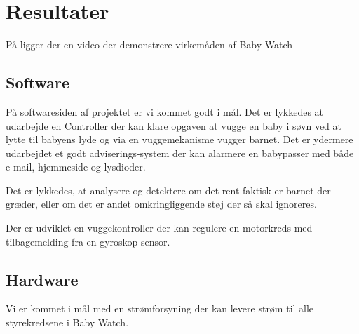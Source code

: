 \chapter{Resultater}

På \citep{cd} ligger der en video der demonstrere virkemåden af Baby Watch

\section{Software}

På softwaresiden af projektet er vi kommet godt i mål. Det er lykkedes at udarbejde en Controller der kan klare opgaven at vugge en baby i søvn ved at lytte til babyens lyde og via en vuggemekanisme vugger barnet. Det er ydermere udarbejdet et godt adviserings-system der kan alarmere en babypasser med både e-mail, hjemmeside og lysdioder.

Det er lykkedes, at analysere og detektere om det rent faktisk er barnet der græder, eller om det er andet omkringliggende støj der så skal ignoreres.

Der er udviklet en vuggekontroller der kan regulere en motorkreds med tilbagemelding fra en gyroskop-sensor.

\section{Hardware}

Vi er kommet i mål med en strømforsyning der kan levere strøm til alle styrekredsene i Baby Watch.